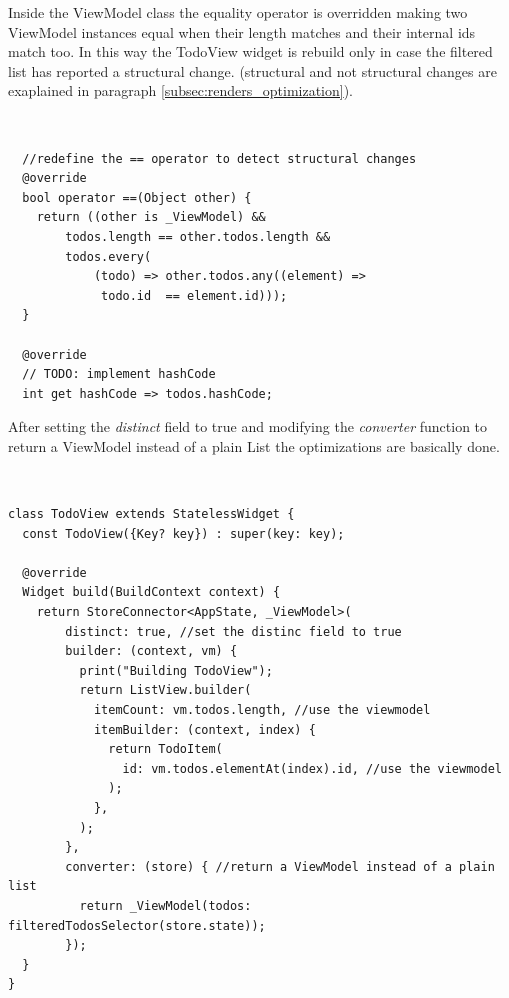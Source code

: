  Inside the ViewModel class the equality operator is overridden making two ViewModel instances equal when their length matches and their internal ids match too. In this way the TodoView widget is rebuild only in case the filtered list has reported a structural change. (structural and not structural changes are exaplained in paragraph \ref{subsec:renders_optimization}). 
\begin{code}
\mbox{}\\
 \mbox{}
		\label{code:2.14}
\begin{verbatim}
  //redefine the == operator to detect structural changes
  @override
  bool operator ==(Object other) {
    return ((other is _ViewModel) &&
        todos.length == other.todos.length &&
        todos.every(
            (todo) => other.todos.any((element) =>
             todo.id  == element.id)));
  }

  @override
  // TODO: implement hashCode
  int get hashCode => todos.hashCode;
\end{verbatim}
\mbox{}
\end{code}

After setting the \textit{distinct} field to true and modifying the \textit{converter} function to return a ViewModel instead of a plain List the optimizations are basically done.
\begin{code}
\mbox{}\\
 \mbox{}
		\label{code:2.14}
\begin{verbatim}
class TodoView extends StatelessWidget {
  const TodoView({Key? key}) : super(key: key);

  @override
  Widget build(BuildContext context) {
    return StoreConnector<AppState, _ViewModel>(
        distinct: true, //set the distinc field to true
        builder: (context, vm) {
          print("Building TodoView");
          return ListView.builder(
            itemCount: vm.todos.length, //use the viewmodel
            itemBuilder: (context, index) {
              return TodoItem(
                id: vm.todos.elementAt(index).id, //use the viewmodel
              );
            },
          );
        },
        converter: (store) { //return a ViewModel instead of a plain list
          return _ViewModel(todos: filteredTodosSelector(store.state));
        });
  }
}
\end{verbatim}
\mbox{}
\end{code}


